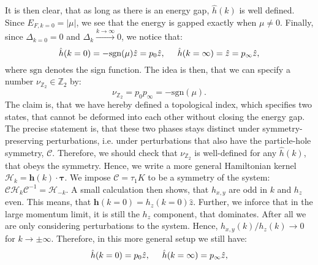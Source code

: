 It is then clear, that as long as there is an energy gap, $\hat{h}(k)$ is well defined. Since $E_{F,k=0} = |\mu|$, we see that the energy is gapped exactly when $\mu \neq 0$. Finally, since $\Delta_{k=0} = 0$ and $\Delta_k \overset{k\to \infty}{\to} 0$, we notice that: 
\begin{equation}
\hat{h}(k = 0) = -\text{sgn}(\mu)\hat{z} = p_0\hat{z}, \hspace{0.5cm} \hat{h}(k = \infty) = \hat{z} = p_{\infty}\hat{z},
\label{eq.hhatk0kinfty}
\end{equation}
where $\text{sgn}$ denotes the sign function. The idea is then, that we can specify a number $\nu_{\mathbb{Z}_2} \in \mathbb{Z}_2$ by:
\begin{equation}
\nu_{\mathbb{Z}_2} = p_0p_{\infty} = -\text{sgn}(\mu).
\label{eq.topinvnudefition}
\end{equation}
The claim is, that we have hereby defined a topological index, which specifies two states, that cannot be deformed into each other without closing the energy gap. The precise statement is, that these two phases stays distinct under symmetry-preserving perturbations, i.e. under perturbations that also have the particle-hole symmetry, $\mathcal{C}$. Therefore, we should check that $\nu_{\mathbb{Z}_2}$ is well-defined for any $\hat{h}(k)$, that obeys the symmetry. Hence, we write a more general Hamiltonian kernel $\mathcal{H}_k = \mathbf{h}(k)\cdot \boldsymbol\tau$. We impose $\mathcal{C} = \tau_1 K$ to be a symmetry of the system: $\mathcal{C}\mathcal{H}_k\mathcal{C}^{-1} = \mathcal{H}_{-k}$. A small calculation then shows, that $h_{x,y}$ are odd in $k$ and $h_z$ even. This means, that $\mathbf{h}(k = 0) = h_z(k = 0)\hat{z}$. Further, we inforce that in the large momentum limit, it is still the $h_z$ component, that dominates. After all we are only considering perturbations to the system. Hence, $h_{x,y}(k)/h_z(k) \to 0$ for $k \to \pm \infty$. Therefore, in this more general setup we still have:
\begin{equation}
\hat{h}(k = 0) = p_0\hat{z}, \hspace{0.5cm} \hat{h}(k = \infty) = p_{\infty}\hat{z}, \nonumber
\end{equation}
